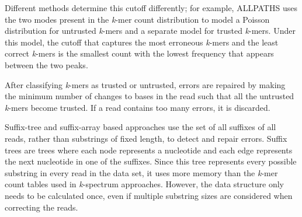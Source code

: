 Different methods determine this cutoff differently; for example,
ALLPATHS \parencite{butler_allpaths:_2008} uses the two modes present in the \textit{k}-mer count distribution to model a Poisson distribution for untrusted \textit{k}-mers and a separate model for trusted \textit{k}-mers. Under this model, the cutoff that captures the most erroneous \textit{k}-mers and the least correct \textit{k}-mers is the smallest count with the lowest frequency that appears between the two peaks.


After classifying \textit{k}-mers as trusted or untrusted,
errors are repaired by making the minimum number of changes to bases in the read such that all the untrusted \textit{k}-mers become trusted. If a read contains too many errors, it is discarded.

Suffix-tree and suffix-array based approaches use the set of all suffixes of all reads, rather than substrings of fixed length, to detect and repair errors. Suffix trees are trees where each node represents a nucleotide and each edge represents the next nucleotide in one of the suffixes. Since this tree represents every possible substring in every read in the data set, it uses more memory than the \textit{k}-mer count tables used in \textit{k}-spectrum approaches. However, the data structure only needs to be calculated once, even if multiple substring sizes are considered when correcting the reads.

